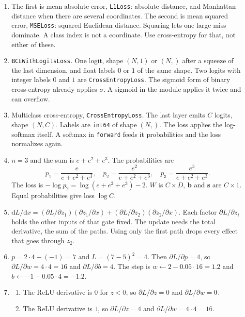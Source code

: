 \documentclass[11pt]{article}
\begin{document}
\begin{enumerate}
\item The first is mean absolute error, \texttt{L1Loss}: absolute distance, and Manhattan distance when there are several coordinates. The second is mean squared error, \texttt{MSELoss}: squared Euclidean distance. Squaring lets one large miss dominate. A class index is not a coordinate. Use cross-entropy for that, not either of these.

\item \texttt{BCEWithLogitsLoss}. One logit, shape $(N,1)$ or $(N,)$ after a squeeze of the last dimension, and float labels $0$ or $1$ of the same shape. Two logits with integer labels $0$ and $1$ are \texttt{CrossEntropyLoss}. The sigmoid form of binary cross-entropy already applies $\sigma$. A sigmoid in the module applies it twice and can overflow.

\item Multiclass cross-entropy, \texttt{CrossEntropyLoss}. The last layer emits $C$ logits, shape $(N,C)$. Labels are \texttt{int64} of shape $(N,)$. The loss applies the log-softmax itself. A softmax in \texttt{forward} feeds it probabilities and the loss normalizes again.

\item $n=3$ and the sum is $e+e^{2}+e^{3}$. The probabilities are
\[
p_1=\frac{e}{e+e^{2}+e^{3}},\quad
p_2=\frac{e^{2}}{e+e^{2}+e^{3}},\quad
p_3=\frac{e^{3}}{e+e^{2}+e^{3}}.
\]
The loss is $-\log p_2=\log(e+e^{2}+e^{3})-2$. $W$ is $C\times D$, $\mathbf{b}$ and $\mathbf{s}$ are $C\times 1$. Equal probabilities give loss $\log C$.

\item $\mathrm{d}L/\mathrm{d}x=(\partial L/\partial z_1)(\partial z_1/\partial x)+(\partial L/\partial z_2)(\partial z_2/\partial x)$. Each factor $\partial L/\partial z_i$ holds the other inputs of that gate fixed. The update needs the total derivative, the sum of the paths. Using only the first path drops every effect that goes through $z_2$.

\item $p=2\cdot 4+(-1)=7$ and $L=(7-5)^{2}=4$. Then $\partial L/\partial p=4$, so $\partial L/\partial w=4\cdot 4=16$ and $\partial L/\partial b=4$. The step is $w\leftarrow 2-0.05\cdot 16=1.2$ and $b\leftarrow -1-0.05\cdot 4=-1.2$.

\item
\begin{enumerate}
\item The ReLU derivative is $0$ for $z<0$, so $\partial L/\partial z=0$ and $\partial L/\partial w=0$.
\item The ReLU derivative is $1$, so $\partial L/\partial z=4$ and $\partial L/\partial w=4\cdot 4=16$.
\end{enumerate}


\end{enumerate}
\end{document}
